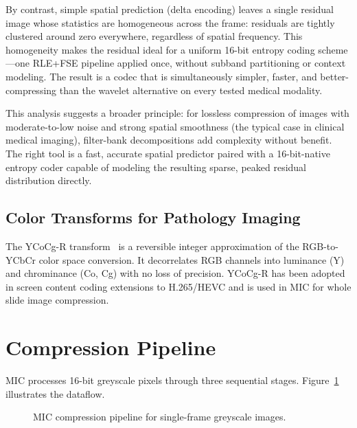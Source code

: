 \documentclass[11pt,twocolumn]{article}
\begin{document}
By contrast, simple spatial prediction (delta encoding) leaves a single residual image whose statistics are homogeneous across the frame: residuals are tightly clustered around zero everywhere, regardless of spatial frequency.
This homogeneity makes the residual ideal for a uniform 16-bit entropy coding scheme---one RLE+FSE pipeline applied once, without subband partitioning or context modeling.
The result is a codec that is simultaneously simpler, faster, and better-compressing than the wavelet alternative on every tested medical modality.

This analysis suggests a broader principle: for lossless compression of images with moderate-to-low noise and strong spatial smoothness (the typical case in clinical medical imaging), filter-bank decompositions add complexity without benefit.
The right tool is a fast, accurate spatial predictor paired with a 16-bit-native entropy coder capable of modeling the resulting sparse, peaked residual distribution directly.

\subsection{Color Transforms for Pathology Imaging}

The YCoCg-R transform~\cite{malvar2003} is a reversible integer approximation of the RGB-to-YCbCr color space conversion.
It decorrelates RGB channels into luminance (Y) and chrominance (Co, Cg) with no loss of precision.
YCoCg-R has been adopted in screen content coding extensions to H.265/HEVC and is used in MIC for whole slide image compression.

\section{Compression Pipeline}
\label{sec:pipeline}

MIC processes 16-bit greyscale pixels through three sequential stages.
Figure~\ref{fig:pipeline} illustrates the dataflow.

\begin{figure}[t]
\centering
{}
\caption{MIC compression pipeline for single-frame greyscale images.}
\label{fig:pipeline}
\end{figure}
\end{document}
